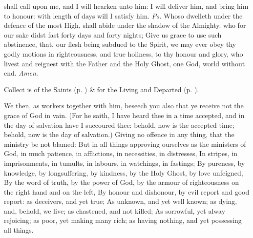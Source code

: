 \introit
{} shall call upon me, and I will hearken unto him: I will deliver him, and bring him to honour: with length of days will I satisfy him. \textit{Ps.} Whoso dwelleth under the defence of the most High, shall abide under the shadow of the Almighty.
\collect
{} who for our sake didst fast forty days and forty nights; Give us grace to use such abstinence, that, our flesh being subdued to the Spirit, we may ever obey thy godly motions in righteousness, and true holiness, to thy honour and glory, who livest and reignest with the Father and the Holy Ghost, one God, world without end. \textit{Amen.}
\begin{rubric}
     Collect is of the Saints (p. \pageref{SPSaints}) \&  for the Living and Departed (p. \pageref{SPLivingDeparted}).
\end{rubric}
 We then, as workers together with him, beseech you also that ye receive not the grace of God in vain. (For he saith, I have heard thee in a time accepted, and in the day of salvation have I succoured thee: behold, now is the accepted time; behold, now is the day of salvation.) Giving no offence in any thing, that the ministry be not blamed: But in all things approving ourselves as the ministers of God, in much patience, in afflictions, in necessities, in distresses, In stripes, in imprisonments, in tumults, in labours, in watchings, in fastings; By pureness, by knowledge, by longsuffering, by kindness, by the Holy Ghost, by love unfeigned, By the word of truth, by the power of God, by the armour of righteousness on the right hand and on the left, By honour and dishonour, by evil report and good report: as deceivers, and yet true; As unknown, and yet well known; as dying, and, behold, we live; as chastened, and not killed; As sorrowful, yet alway rejoicing; as poor, yet making many rich; as having nothing, and yet possessing all things.
